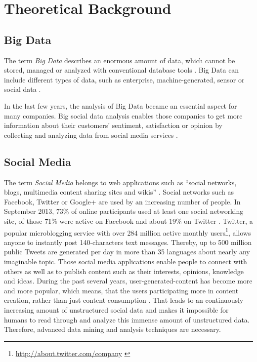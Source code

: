 
\chapter{Theoretical Background}
\label{cha:background}

\section{Big Data}
\label{sec:big-data}
The term \textit{Big Data} describes an enormous amount of data, which cannot be stored, managed or analyzed with conventional database tools \cite{web2011linkeddata}. Big Data can include different types of data, such as enterprise, machine-generated, sensor or social data \cite[3]{oraclebigdata}.

In the last few years, the analysis of Big Data became an essential aspect for many companies. Big social data analysis enables those companies to get more information about their customers' sentiment, satisfaction or opinion by collecting and analyzing data from social media services \cite{oraclebigdata}.

\section{Social Media}
\label{sec:social-media}
The term \textit{Social Media} belongs to web applications such as \enquote{social networks, blogs, multimedia content sharing sites and wikis} \cite{eu2013socialmedia}. Social networks such as Facebook, Twitter or Google+ are used by an increasing number of people. In September 2013, 73\% of online participants used at least one social networking site, of those 71\% were active on Facebook and about 19\% on Twitter \cite{pewresearchsocialmediafact}. Twitter, a popular microblogging service with over 284 million active monthly users\footnote{\url{http://about.twitter.com/company} \accessednote \label{aboutwitter}}, allows anyone to instantly post 140-characters text messages. Thereby, up to 500 million public Tweets are generated per day in more than 35 languages about nearly any imaginable topic.  Those social media applications enable people to connect with others as well as to publish content such as their interests, opinions, knowledge and ideas. During the past several years, user-generated-content has become more and more popular, which means, that the users participating more in content creation, rather than just content consumption \cite[1]{Agichtein:2008:FHC:1341531.1341557}.  That leads to an continuously increasing amount of unstructured social data and makes it impossible for humans to read through and analyze this immense amount of unstructured data. Therefore, advanced data mining and analysis techniques are necessary.

